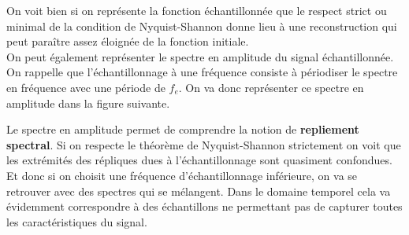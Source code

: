 \documentclass[11pt,a4paper]{article}
\begin{document}
On voit bien si on représente la fonction échantillonnée que le respect strict ou minimal de la condition de Nyquist-Shannon donne lieu à une reconstruction qui peut paraître assez éloignée de la fonction initiale.  
\\

On peut également représenter le spectre en amplitude du signal échantillonnée. On rappelle que l'échantillonnage à une fréquence consiste à périodiser le spectre en fréquence avec une période de $f_e$. On va donc représenter ce spectre en amplitude dans la figure suivante.\\

\begin{center}
\end{center}

Le spectre en amplitude permet de comprendre la notion de \textbf{repliement spectral}. Si on respecte le théorème de Nyquist-Shannon strictement on voit que les extrémités des répliques dues à l'échantillonnage sont quasiment confondues. Et donc si on choisit une fréquence d'échantillonnage inférieure, on va se retrouver avec des spectres qui se mélangent. Dans le domaine temporel cela va évidemment correspondre à des échantillons ne permettant pas de capturer toutes les caractéristiques du signal.\\
\end{document}
